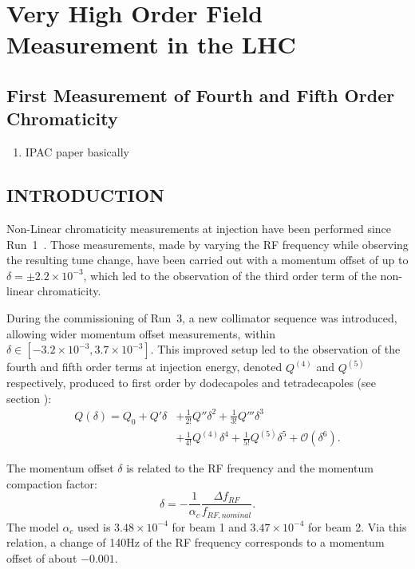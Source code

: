 \chapter{Very High Order Field Measurement in the LHC}
\thumbforchapter{}
\chaptertoc{}
\newpage

\section{First Measurement of Fourth and Fifth Order Chromaticity}

\begin{enumerate}
\color{red}
    \item IPAC paper basically
\end{enumerate}


\section{INTRODUCTION}

Non-Linear chromaticity measurements at injection have been performed since Run~1~\cite{maclean:ipac11-wepc078,maclean:ipac16-thpmr039,maclean_commissioning_2016,maclean_measurement_2014-1}. Those measurements, made by varying the RF frequency while observing the resulting tune change, have been
carried out with a momentum offset of up to $\delta = \pm 2.2 \times 10^{-3}$, which led to the
observation of the third order term of the non-linear chromaticity.

During the commissioning of Run~3, a new collimator sequence was introduced, allowing wider
momentum offset measurements, within $\delta \in [-3.2\times 10^{-3},3.7 \times 10^{-3}]$.
This improved setup led to the observation of the fourth and fifth order
terms at injection energy, denoted $Q^{(4)}$ and $Q^{(5)}$ respectively, produced to first order by dodecapoles and tetradecapoles (see section ):
\begin{equation}
\begin{aligned}
Q(\delta) = Q_0 + Q'\delta &+ \frac{1}{2!}Q''\delta^2 + \frac{1}{3!}Q'''\delta^3 \\
                           &+ \frac{1}{4!}Q^{(4)}\delta^4  + \frac{1}{5!}Q^{(5)}\delta^5 + \mathcal{O}(\delta^6).
\end{aligned}
\end{equation}

The momentum offset $\delta$ is  related to the RF frequency and the momentum compaction factor:
$$
\delta = -\frac{1}{\alpha_c} \frac{\Delta f_{RF}}{f_{RF,nominal}}.
$$
The model $\alpha_c$ used is $3.48 \times 10^{-4}$ for beam 1 and $3.47 \times 10^{-4}$ for beam 2.
Via this relation, a change of 140Hz of the RF frequency corresponds to a momentum offset of about $-0.001$.

